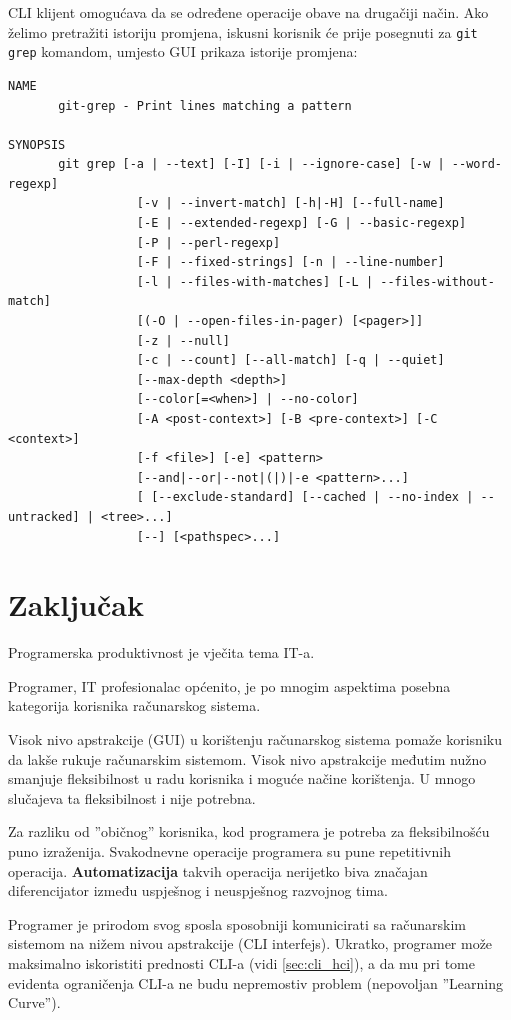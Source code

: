 \documentclass[times, utf8, seminar]{fit}
\begin{document}
CLI klijent omogućava da se određene operacije obave na drugačiji način. Ako želimo pretražiti istoriju promjena, iskusni korisnik će prije posegnuti za \verb+git grep+ komandom, umjesto GUI prikaza istorije promjena:

\begin{lstlisting}  
NAME
       git-grep - Print lines matching a pattern

SYNOPSIS
       git grep [-a | --text] [-I] [-i | --ignore-case] [-w | --word-regexp]
                  [-v | --invert-match] [-h|-H] [--full-name]
                  [-E | --extended-regexp] [-G | --basic-regexp]
                  [-P | --perl-regexp]
                  [-F | --fixed-strings] [-n | --line-number]
                  [-l | --files-with-matches] [-L | --files-without-match]
                  [(-O | --open-files-in-pager) [<pager>]]
                  [-z | --null]
                  [-c | --count] [--all-match] [-q | --quiet]
                  [--max-depth <depth>]
                  [--color[=<when>] | --no-color]
                  [-A <post-context>] [-B <pre-context>] [-C <context>]
                  [-f <file>] [-e] <pattern>
                  [--and|--or|--not|(|)|-e <pattern>...]
                  [ [--exclude-standard] [--cached | --no-index | --untracked] | <tree>...]
                  [--] [<pathspec>...]
\end{lstlisting}


\chapter{Zaključak}

Programerska produktivnost je vječita tema IT-a. 

Programer, IT profesionalac općenito, je po mnogim aspektima posebna kategorija korisnika računarskog sistema. 

Visok nivo apstrakcije (GUI) u korištenju računarskog sistema pomaže korisniku da lakše rukuje računarskim sistemom. Visok nivo apstrakcije međutim nužno smanjuje fleksibilnost u radu korisnika i moguće načine korištenja. U mnogo slučajeva ta fleksibilnost i nije potrebna. 

Za razliku od ''običnog'' korisnika, kod programera je potreba za fleksibilnošću puno izraženija. Svakodnevne operacije programera su pune repetitivnih operacija. \textbf{Automatizacija} takvih operacija nerijetko biva značajan diferencijator između uspješnog i neuspješnog razvojnog tima.
 
Programer je prirodom svog sposla sposobniji komunicirati sa računarskim sistemom na nižem nivou apstrakcije (CLI interfejs). Ukratko, programer može maksimalno iskoristiti prednosti CLI-a (vidi \ref{sec:cli_hci}), a da mu pri tome evidenta ograničenja CLI-a ne budu nepremostiv problem (nepovoljan ''Learning Curve'').
\end{document}
